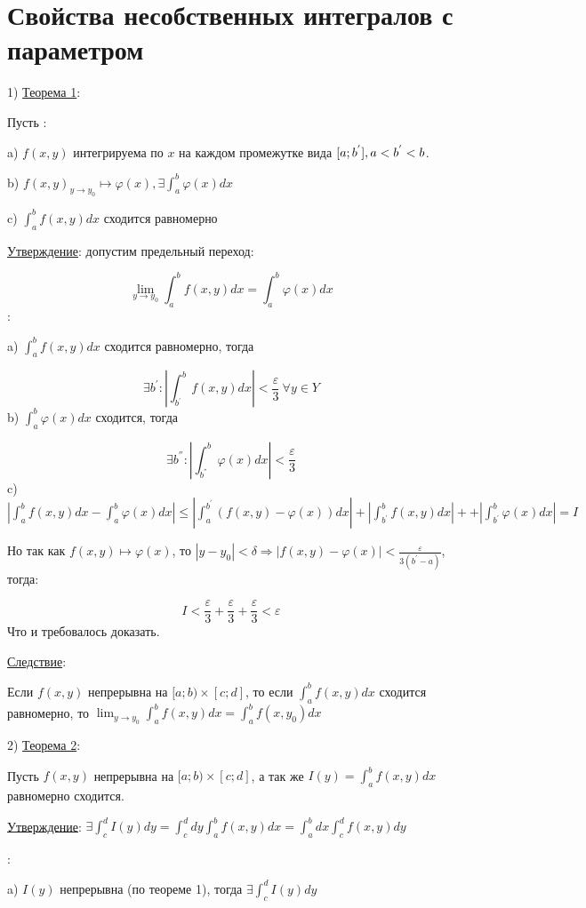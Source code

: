 \documentclass[12pt]{article}
\begin{document}
\section{Свойства несобственных интегралов с параметром}
1) \uline{Теорема 1}:\par
Пусть :\par
a) $f(x,y)$ интегрируема по $x$ на каждом промежутке вида $[a;b^{'}],\\ a < b^{'} < b$.\par
b) $f(x,y)_{y\to y_0} \mapsto \varphi(x), \exists \int_a^b \varphi(x) dx$\par
c) $\int_a^b f(x,y) dx$ сходится равномерно\par
\uline{Утверждение}: допустим предельный переход:\par
$$\lim_{y\to y_0} \int_a^b f(x,y) dx = \int_a^b \varphi(x) dx$$
:\par
a) $\int_a^b f(x,y) dx$ сходится равномерно, тогда\par
$$\exists b^{'} : |\int_{b^{'}}^{b} f(x, y) dx| < \frac{\varepsilon}{3} \ \forall y \in Y$$
b) $\int_a^b \varphi(x) dx$ сходится, тогда\par
$$\exists b^{''}: |\int_{b^{''}}^{b} \varphi(x) dx| < \frac{\varepsilon}{3}$$
c) $|\int_a^b f(x,y) dx - \int_a^b \varphi(x) dx| \leq |\int_a^{b^{'}} (f(x,y) - \varphi(x)) dx | + |\int_{b^{'}}^{b} f(x,y) dx | ++ |\int_{b^{'}}^b \varphi(x) dx| = I$\par
Но так как $f(x,y) \mapsto \varphi(x)$, то $|y - y_0| < \delta \Rightarrow |f(x,y) - \varphi(x)| < \frac{\varepsilon}{3(b^{'}-a)}$, тогда:\par
$$I < \frac{\varepsilon}{3} + \frac{\varepsilon}{3} + \frac{\varepsilon}{3} < \varepsilon$$
Что и требовалось доказать.\par
\uline{Следствие}:\par
Если $f(x,y)$ непрерывна на $[a;b) \times [c;d]$, то если $\int_a^b f(x,y) dx$ сходится равномерно, то $\lim_{y \to y_0} \int_a^b f(x,y) dx = \int_a^b f(x,y_0) dx$\par
2) \uline{Теорема 2}:\par
Пусть $f(x,y)$ непрерывна на $[a; b) \times [c;d]$, а так же $I(y) = \int_a^b f(x,y) dx$ равномерно сходится.\par
\uline{Утверждение}: $\exists \int_c^d I(y) dy = \int_c^d dy \int_a^b f(x,y) dx = \int_a^b dx \int_c^d f(x,y) dy$\par
{}:\par
a) $I(y)$ непрерывна (по теореме 1), тогда $\exists \int_c^d I(y) dy$\par
\end{document}
